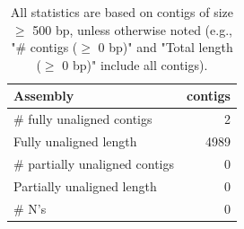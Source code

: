\documentclass[12pt,a4paper]{article}
\begin{document}
\begin{table}[ht]
\begin{center}
\caption{All statistics are based on contigs of size $\geq$ 500 bp, unless otherwise noted (e.g., "\# contigs ($\geq$ 0 bp)" and "Total length ($\geq$ 0 bp)" include all contigs).}
\begin{tabular}{|l*{1}{|r}|}
\hline
Assembly & contigs \\ \hline
\# fully unaligned contigs & 2 \\ \hline
Fully unaligned length & 4989 \\ \hline
\# partially unaligned contigs & 0 \\ \hline
Partially unaligned length & 0 \\ \hline
\# N's & 0 \\ \hline
\end{tabular}
\end{center}
\end{table}
\end{document}
